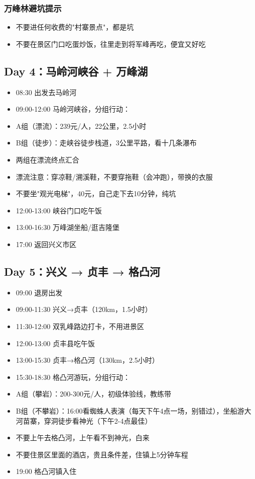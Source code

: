 \documentclass[12pt,a4paper,UTF8]{ctexart}
\begin{document}
\subsubsection{万峰林避坑提示}
\begin{itemize}
\item 不要进任何收费的"村寨景点"，都是坑
\item 不要在景区门口吃蛋炒饭，往里走到将军峰再吃，便宜又好吃
\end{itemize}

\subsection{Day 4：马岭河峡谷 + 万峰湖}
\begin{itemize}
\item 08:30 出发去马岭河
\item 09:00-12:00 马岭河峡谷，分组行动：
\item A组（漂流）：239元/人，22公里，2.5小时
\item B组（徒步）：走峡谷徒步栈道，3公里平路，看十几条瀑布
\item 两组在漂流终点汇合
\item 漂流注意：穿凉鞋/溯溪鞋，不要穿拖鞋（会冲跑），带换的衣服
\item 不要坐"观光电梯"，40元，自己走下去10分钟，纯坑
\item 12:00-13:00 峡谷门口吃午饭
\item 13:00-16:30 万峰湖坐船/逛吉隆堡
\item 17:00 返回兴义市区
\end{itemize}

\subsection{Day 5：兴义 → 贞丰 → 格凸河}
\begin{itemize}
\item 09:00 退房出发
\item 09:00-11:30 兴义→贞丰（120km，1.5小时）
\item 11:30-12:00 双乳峰路边打卡，不用进景区
\item 12:00-13:00 贞丰县吃午饭
\item 13:00-15:30 贞丰→格凸河（130km，2.5小时）
\item 15:30-18:30 格凸河游玩，分组行动：
\item A组（攀岩）：200-300元/人，初级体验线，教练带
\item B组（不攀岩）：16:00看蜘蛛人表演（每天下午4点一场，别错过），坐船游大河苗寨，穿洞徒步看神光（下午2-4点最佳）
\item 不要上午去格凸河，上午看不到神光，白来
\item 不要住景区里面的酒店，贵且条件差，住镇上5分钟车程
\item 19:00 格凸河镇入住
\end{itemize}
\end{document}
